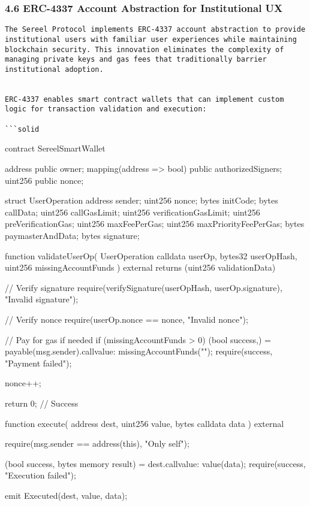 \documentclass[12pt]{article}
\begin{document}
\subsubsection{4.6 ERC-4337 Account Abstraction for Institutional UX} %

\begin{lstlisting}
The Sereel Protocol implements ERC-4337 account abstraction to provide institutional users with familiar user experiences while maintaining blockchain security. This innovation eliminates the complexity of managing private keys and gas fees that traditionally barrier institutional adoption.


ERC-4337 enables smart contract wallets that can implement custom logic for transaction validation and execution:

```solid
\end{lstlisting}
contract SereelSmartWallet {    address public owner;    mapping(address => bool) public authorizedSigners;    uint256 public nonce;

    struct UserOperation {        address sender;        uint256 nonce;        bytes initCode;        bytes callData;        uint256 callGasLimit;        uint256 verificationGasLimit;        uint256 preVerificationGas;        uint256 maxFeePerGas;        uint256 maxPriorityFeePerGas;        bytes paymasterAndData;        bytes signature;    }

    function validateUserOp(        UserOperation calldata userOp,        bytes32 userOpHash,        uint256 missingAccountFunds    ) external returns (uint256 validationData) {        // Verify signature        require(verifySignature(userOpHash, userOp.signature), "Invalid signature");

        // Verify nonce        require(userOp.nonce == nonce, "Invalid nonce");

        // Pay for gas if needed        if (missingAccountFunds > 0) {            (bool success,) = payable(msg.sender).call{value: missingAccountFunds}("");            require(success, "Payment failed");        }

        nonce++;

        return 0; // Success    }

    function execute(        address dest,        uint256 value,        bytes calldata data    ) external {        require(msg.sender == address(this), "Only self");

        (bool success, bytes memory result) = dest.call{value: value}(data);        require(success, "Execution failed");

        emit Executed(dest, value, data);    }}
\end{document}

